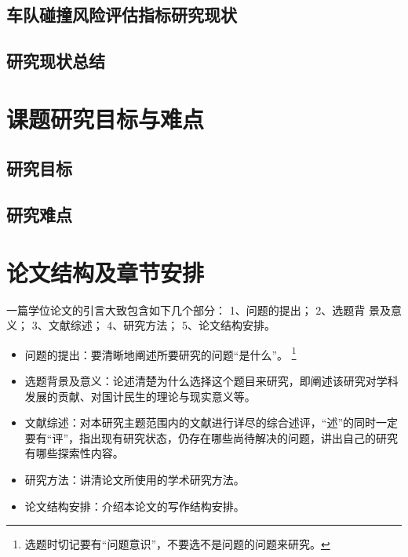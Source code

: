 \subsection{车队碰撞风险评估指标研究现状}

\subsection{研究现状总结}

\section{课题研究目标与难点}

\subsection{研究目标}

\subsection{研究难点}




\section{论文结构及章节安排}

一篇学位论文的引言大致包含如下几个部分：
1、问题的提出；
2、选题背 景及意义；
3、文献综述；
4、研究方法；
5、论文结构安排。
\begin{itemize}
  \item 问题的提出：要清晰地阐述所要研究的问题“是什么”。
    \footnote{选题时切记要有“问题意识”，不要选不是问题的问题来研究。}
  \item 选题背景及意义：论述清楚为什么选择这个题目来研究，即阐述该研究对学科发展的贡献、对国计民生的理论与现实意义等。
  \item 文献综述：对本研究主题范围内的文献进行详尽的综合述评，“述”的同时一定要有“评”，指出现有研究状态，仍存在哪些尚待解决的问题，讲出自己的研究有哪些探索性内容。
  \item 研究方法：讲清论文所使用的学术研究方法。
  \item 论文结构安排：介绍本论文的写作结构安排。
\end{itemize}



